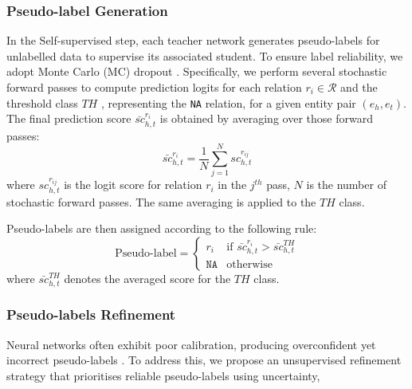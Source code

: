 \subsubsection{Pseudo-label Generation}
\label{sec:pseudo-label-gen}
In the Self-supervised step, each teacher network generates pseudo-labels for unlabelled data to supervise its associated student. To ensure label reliability, we adopt Monte Carlo (MC) dropout \citep{gal2016dropout}. Specifically, we perform several stochastic forward passes to compute prediction logits for each relation $r_i \in \mathcal{R}$ and the threshold class $TH$ \citep{zhou2021document}, representing the {\tt NA} relation, for a given entity pair $(e_h, e_t)$. The final prediction score $\bar{sc}_{h,t}^{r_i}$ is obtained by averaging over those forward passes:
\begin{equation}
    \label{pred-logits}
    \bar{sc}_{h,t}^{r_i} = \frac{1}{N} \sum_{j=1}^N sc_{h,t}^{r_{ij}}
\end{equation}
where $sc_{h,t}^{r_{ij}}$ is the logit score for relation $r_i$ in the $j^{th}$ pass, $N$ is the number of stochastic forward passes. The same averaging is applied to the $TH$ class.

Pseudo-labels are then assigned according to the following rule:
$$
\text{Pseudo-label} =
\begin{cases}
    r_i & \text{if } \bar{sc}_{h,t}^{r_i} > \bar{sc}_{h,t}^{TH} \\
    \texttt{NA} & \text{otherwise}
\end{cases}
$$
where $\bar{sc}_{h,t}^{TH}$ denotes the averaged score for the $TH$ class.


\subsubsection{Pseudo-labels Refinement}
\label{sec:pseudo-label-refine}

Neural networks often exhibit poor calibration, producing overconfident yet incorrect pseudo-labels \citep{guo2017calibration, rizve2021in, si2024improving}. To address this, we propose an unsupervised refinement strategy that prioritises reliable pseudo-labels using uncertainty,

